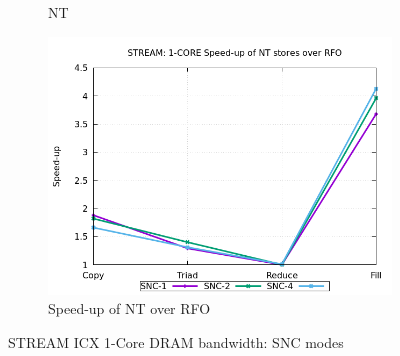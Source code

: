 \documentclass{article}
\begin{document}
\begin{figure}[!hb]
\begin{subfigure}[!hb]{0.3\textwidth}
         \caption{NT}
         \label{figure:mem_bw_core_nt_icx_snc}
    \end{subfigure}
    \begin{subfigure}[!hb]{0.3\textwidth}
         \centering
         \includegraphics[width=\textwidth]{../data/icx-32c-snc/mem_bw_core/mb_core_nt_rfo}
         \caption{Speed-up of NT over RFO}
         \label{figure:mem_bw_core_nt_rfo_icx_snc}
    \end{subfigure}

    \caption{STREAM ICX 1-Core DRAM bandwidth: SNC modes}
    \label{figure:mem_bw_core_icx_snc}
\end{figure}
\end{document}
